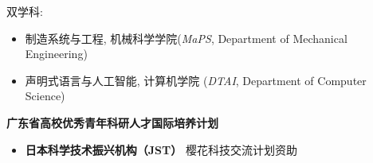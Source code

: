 \documentclass{resume}
\begin{document}

\vspace*{-2mm}
双学科:
\begin{itemize}
  \item 制造系统与工程, 机械科学学院(\textit{MaPS}, Department of Mechanical Engineering)
  \item 声明式语言与人工智能, 计算机学院 (\textit{DTAI}, Department of Computer Science)
\end{itemize}

\vspace*{-2mm}
\textbf{广东省高校优秀青年科研人才国际培养计划} \\

\vspace*{-2mm}
\begin{itemize}[parsep=0.5ex]
  \item \textbf{日本科学技术振兴机构（JST）} 樱花科技交流计划资助
\end{itemize}
\end{document}
